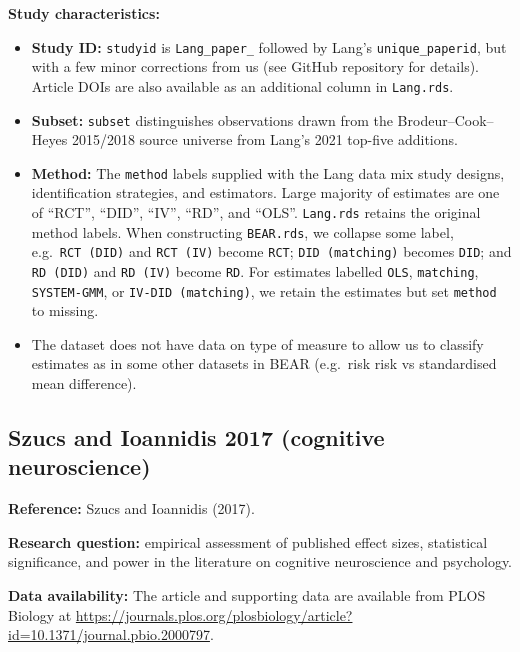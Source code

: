 \documentclass[
  11pt,
]{article}
\providecommand{\tightlist}{%
  \setlength{\itemsep}{0pt}\setlength{\parskip}{0pt}}
\begin{document}
\textbf{Study characteristics:}

\begin{itemize}
\tightlist
\item
  \textbf{Study ID:} \texttt{studyid} is \texttt{Lang\_paper\_} followed
  by Lang's \texttt{unique\_paperid}, but with a few minor corrections
  from us (see GitHub repository for details). Article DOIs are also
  available as an additional column in \texttt{Lang.rds}.
\item
  \textbf{Subset:} \texttt{subset} distinguishes observations drawn from
  the Brodeur--Cook--Heyes 2015/2018 source universe from Lang's 2021
  top-five additions.
\item
  \textbf{Method:} The \texttt{method} labels supplied with the Lang
  data mix study designs, identification strategies, and estimators.
  Large majority of estimates are one of ``RCT'', ``DID'', ``IV'',
  ``RD'', and ``OLS''. \texttt{Lang.rds} retains the original method
  labels. When constructing \texttt{BEAR.rds}, we collapse some label,
  e.g.~\texttt{RCT\ (DID)} and \texttt{RCT\ (IV)} become \texttt{RCT};
  \texttt{DID\ (matching)} becomes \texttt{DID}; and \texttt{RD\ (DID)}
  and \texttt{RD\ (IV)} become \texttt{RD}. For estimates labelled
  \texttt{OLS}, \texttt{matching}, \texttt{SYSTEM-GMM}, or
  \texttt{IV-DID\ (matching)}, we retain the estimates but set
  \texttt{method} to missing.
\item
  The dataset does not have data on type of measure to allow us to
  classify estimates as in some other datasets in BEAR (e.g.~risk risk
  vs standardised mean difference).
\end{itemize}

\newpage

\subsection{Szucs and Ioannidis 2017 (cognitive
neuroscience)}\label{szucs-and-ioannidis-2017-cognitive-neuroscience}

\textbf{Reference:} Szucs and Ioannidis (2017).

\textbf{Research question:} empirical assessment of published effect
sizes, statistical significance, and power in the literature on
cognitive neuroscience and psychology.

\textbf{Data availability:} The article and supporting data are
available from PLOS Biology at
\url{https://journals.plos.org/plosbiology/article?id=10.1371/journal.pbio.2000797}.
\end{document}
